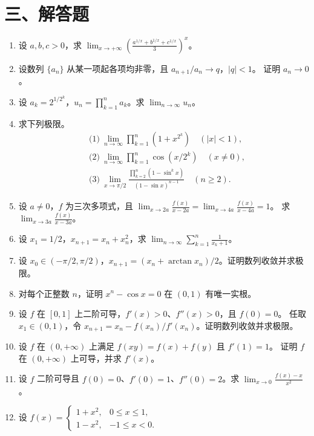 \documentclass[UTF8,a4paper,zihao=-4,fontset=fandol]{ctexart}
\begin{document}
\section*{三、解答题}
\begin{enumerate}[start=50]
\item 设 $a,b,c>0$，求 $\displaystyle\lim_{x\to+\infty}
\left(\frac{a^{1/x}+b^{1/x}+c^{1/x}}3\right)^x$。
\item 设数列 $\{a_n\}$ 从某一项起各项均非零，且 $a_{n+1}/a_n\to q$，$|q|<1$。
证明 $a_n\to0$。
\item 设 $a_k=2^{1/2^k}$，$u_n=\prod_{k=1}^n a_k$。求 $\lim_{n\to\infty}u_n$。
\item 求下列极限。
\[
\begin{aligned}
  &\text{(1)}\ \lim_{n\to\infty}\prod_{k=1}^n(1+x^{2^k})\quad (|x|<1),\\
  &\text{(2)}\ \lim_{n\to\infty}\prod_{k=1}^n\cos(x/2^k)\quad (x\ne0),\\
  &\text{(3)}\ \lim_{x\to\pi/2}\frac{\prod_{k=2}^{n}(1-\sin^k x)}
    {(1-\sin x)^{n-1}}\quad (n\ge2).
\end{aligned}
\]
\item 设 $a\ne0$，$f$ 为三次多项式，且
$\displaystyle\lim_{x\to2a}\frac{f(x)}{x-2a}=\lim_{x\to4a}\frac{f(x)}{x-4a}=1$。
求 $\displaystyle\lim_{x\to3a}\frac{f(x)}{x-3a}$。
\item 设 $x_1=1/2$，$x_{n+1}=x_n+x_n^2$，求 $\displaystyle\lim_{n\to\infty}\sum_{k=1}^n\frac1{x_k+1}$。
\item 设 $x_0\in(-\pi/2,\pi/2)$，$x_{n+1}=(x_n+\arctan x_n)/2$。证明数列收敛并求极限。
\item 对每个正整数 $n$，证明 $x^n-\cos x=0$ 在 $(0,1)$ 有唯一实根。
\item 设 $f$ 在 $[0,1]$ 上二阶可导，$f'(x)>0$、$f''(x)>0$，且 $f(0)=0$。
任取 $x_1\in(0,1)$，令 $x_{n+1}=x_n-f(x_n)/f'(x_n)$。证明数列收敛并求极限。
\item 设 $f$ 在 $(0,+\infty)$ 上满足 $f(xy)=f(x)+f(y)$ 且 $f'(1)=1$。
证明 $f$ 在 $(0,+\infty)$ 上可导，并求 $f'(x)$。
\item 设 $f$ 二阶可导且 $f(0)=0$、$f'(0)=1$、$f''(0)=2$。求
$\displaystyle\lim_{x\to0}\frac{f(x)-x}{x^2}$。
\item 设 $f(x)=\begin{cases}1+x^2,&0\le x\le1,\\1-x^2,&-1\le x<0.\end{cases}$

\end{enumerate}
\end{document}
